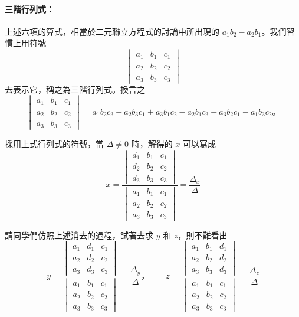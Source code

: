 \paragraph{三階行列式：}
上述六項的算式，相當於二元聯立方程式的討論中所出現的 $a_1 b_2 - a_2 b_1$。我們習慣上用符號
\begin{equation*}
  \begin{vmatrix}
    a_1 & b_1 & c_1 \\
    a_2 & b_2 & c_2 \\
    a_3 & b_3 & c_3
  \end{vmatrix}
\end{equation*}
去表示它，稱之為三階行列式。換言之
\begin{equation*}
  \begin{vmatrix}
    a_1 & b_1 & c_1 \\
    a_2 & b_2 & c_2 \\
    a_3 & b_3 & c_3
  \end{vmatrix}
  = a_1 b_2 c_3 + a_2 b_3 c_1 + a_3 b_1 c_2 - a_2 b_1 c_3 - a_3 b_2 c_1 - a_1 b_3 c_2 \text{。}
\end{equation*}

採用上式行列式的符號，當 $\Delta \neq 0$ 時，解得的 $x$ 可以寫成
\begin{equation*}
  x = \frac{\begin{vmatrix}
    d_1 & b_1 & c_1 \\
    d_2 & b_2 & c_2 \\
    d_3 & b_3 & c_3
  \end{vmatrix}}{\begin{vmatrix}
    a_1 & b_1 & c_1 \\
    a_2 & b_2 & c_2 \\
    a_3 & b_3 & c_3
  \end{vmatrix}}
  = \frac{\Delta_x}{\Delta}
\end{equation*}

請同學們仿照上述消去的過程，試著去求 $y$ 和 $z$，則不難看出
\begin{equation*}
  y = \frac{\begin{vmatrix}
    a_1 & d_1 & c_1 \\
    a_2 & d_2 & c_2 \\
    a_3 & d_3 & c_3
  \end{vmatrix}}{\begin{vmatrix}
    a_1 & b_1 & c_1 \\
    a_2 & b_2 & c_2 \\
    a_3 & b_3 & c_3
  \end{vmatrix}}
  = \frac{\Delta_y}{\Delta} \text{，} \qquad
  z = \frac{\begin{vmatrix}
    a_1 & b_1 & d_1 \\
    a_2 & b_2 & d_2 \\
    a_3 & b_3 & d_3
  \end{vmatrix}}{\begin{vmatrix}
    a_1 & b_1 & c_1 \\
    a_2 & b_2 & c_2 \\
    a_3 & b_3 & c_3
  \end{vmatrix}}
  = \frac{\Delta_z}{\Delta}
\end{equation*}

